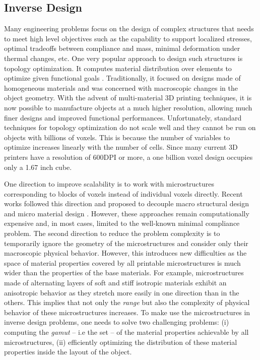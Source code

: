 \subsection{Inverse Design}
Many engineering problems focus on the design of complex structures that needs to meet high level objectives such as the capability to support localized stresses, optimal tradeoffs between compliance and mass, minimal deformation under thermal changes, etc. One very popular approach to design such structures is topology optimization. It computes material distribution over elements to optimize given functional goals \cite{bendsoe2004topology}.
Traditionally, it focused on designs made of homogeneous materials and was concerned with macroscopic changes in the object geometry.
With the advent of multi-material 3D printing techniques, it is now possible to manufacture objects at a much higher resolution, allowing much finer designs and improved functional performances.
Unfortunately, standard techniques for topology optimization do not scale well and they cannot be run on objects with billions of voxels. This is because the number of variables to optimize increases linearly with the number of cells. Since many current 3D printers have a resolution of 600DPI or more, a one billion voxel design occupies only a 1.67 inch cube.

One direction to improve scalability is to work with microstructures corresponding to blocks of voxels instead of individual voxels directly. Recent works followed this direction and proposed to decouple macro structural design and micro material design \cite{rodrigues:2002:hierarchical,coelho:2008:hierarchical,nakshatrala:2013:nonlinear}. However, these approaches remain computationally expensive and, in most cases, limited to the well-known minimal compliance problem.
The second direction to reduce the problem complexity is to temporarily ignore the geometry of the microstructures and consider only their macroscopic physical behavior.
However, this introduces new difficulties as the space of material properties covered by all printable microstructures is much wider than the properties of the base materials.
For example, microstructures made of alternating layers of soft and stiff isotropic materials exhibit an anisotropic behavior as they stretch more easily in one direction than in the others.
This implies that not only the {\it range} but also the complexity of physical behavior of these microstructures increases.
To make use the microstructures in inverse design problems, one needs to solve two challenging problems:
(i) computing the {\it gamut} -- i.e the set -- of the material properties achievable by all microstructures, (ii) efficiently optimizing the distribution of these material properties inside the layout of the object.

